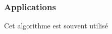 \documentclass{article}
\begin{document}
\subsubsection{Applications}
Cet algorithme est souvent utilisé 





\end{document}

